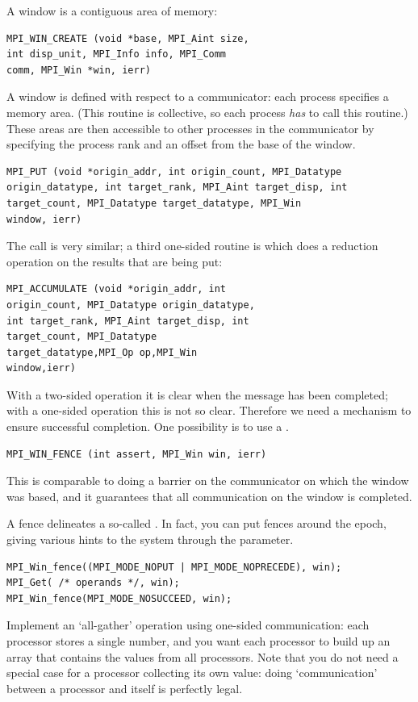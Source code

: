 A window is a contiguous area of memory:
\begin{verbatim}
MPI_WIN_CREATE (void *base, MPI_Aint size, 
int disp_unit, MPI_Info info, MPI_Comm 
comm, MPI_Win *win, ierr)
\end{verbatim}
A window is defined with respect to a communicator: each process
specifies a memory area. (This routine is collective, so each
process \emph{has} to call this routine.) These areas are then
accessible to other processes in the communicator by specifying the
process rank and an offset from the base of the window.
\begin{verbatim}
MPI_PUT (void *origin_addr, int origin_count, MPI_Datatype 
origin_datatype, int target_rank, MPI_Aint target_disp, int 
target_count, MPI_Datatype target_datatype, MPI_Win 
window, ierr)
\end{verbatim}
The  call is very similar; a third one-sided routine
is  which does a reduction operation on the results
that are being put:
\begin{verbatim}
MPI_ACCUMULATE (void *origin_addr, int
origin_count, MPI_Datatype origin_datatype, 
int target_rank, MPI_Aint target_disp, int
target_count, MPI_Datatype
target_datatype,MPI_Op op,MPI_Win 
window,ierr)
\end{verbatim}

With a two-sided operation it is clear when the message has been
completed; with a one-sided operation this is not so clear. Therefore
we need a mechanism to ensure successful completion. One possibility
is to use a .
\begin{verbatim}
MPI_WIN_FENCE (int assert, MPI_Win win, ierr)
\end{verbatim}
This is comparable to doing a barrier on the communicator on which the
window was based, and it guarantees that all communication on the
window is completed.

A fence delineates a so-called . In fact, you
can put fences around the epoch, giving various hints to the system
through the  parameter.
\begin{verbatim}
MPI_Win_fence((MPI_MODE_NOPUT | MPI_MODE_NOPRECEDE), win);
MPI_Get( /* operands */, win);
MPI_Win_fence(MPI_MODE_NOSUCCEED, win);
\end{verbatim}

\begin{exercise}
  Implement an `all-gather' operation using one-sided communication:
  each processor stores a single number, and you want each processor
  to build up an array that contains the values from all
  processors. Note that you do not need a special case for a processor
  collecting its own value: doing `communication' between a processor
  and itself is perfectly legal.
\end{exercise}


